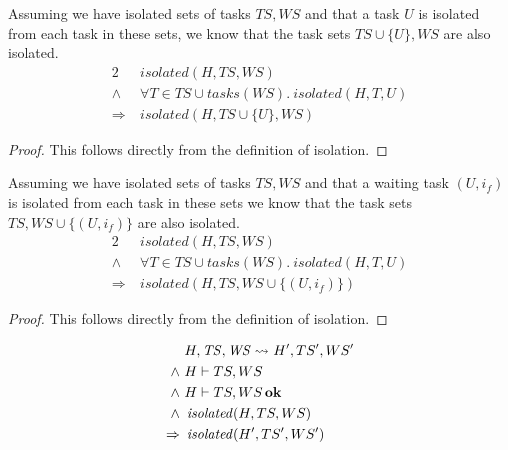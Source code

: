 \begin{lemma}\label{iso-step-ts}
Assuming we have isolated sets of tasks $TS, WS$ and that a task $U$ is isolated from each task in these sets, we know that the task sets $TS \cup \{U\}, WS$ are also isolated.
\begin{alignat*}{2}
    &isolated(H, TS, WS)\\
    \wedge\ &\forall T \in TS \cup tasks(WS).\ isolated(H, T, U)\\
    \Rightarrow\ &isolated(H, TS \cup \{U\}, WS)
\end{alignat*}
\end{lemma}
\begin{proof}
This follows directly from the definition of isolation.
\end{proof}

\begin{lemma}\label{iso-step-ws}
Assuming we have isolated sets of tasks $TS, WS$ and that a waiting task $(U,i_f)$ is isolated from each task in these sets we know that the task sets $TS, WS \cup \{(U,i_f)\}$ are also isolated.
\begin{alignat*}{2}
    &isolated(H, TS, WS)\\
    \wedge\ &\forall T \in TS \cup tasks(WS).\ isolated(H, T, U)\\
    \Rightarrow\ &isolated(H, TS,WS \cup \{(U, i_f)\})
\end{alignat*}
\end{lemma}
\begin{proof}
This follows directly from the definition of isolation.
\end{proof}

\begin{theorem}[Isolation]
\begin{alignat}{3}
    &\reductasks{}*[H']{}[TS',WS']* \label{iso-prem-reduc}\\
    \wedge\ & H \vdash TS, WS\\
    \wedge\ & H \vdash TS, WS \bn{ok} \label{iso-prem-ok}\\
    \wedge\ & \vn{isolated}(H, TS, WS) \label{iso-prem-iso}\\
    \Rightarrow\ & \vn{isolated}(H', TS', WS') \label{iso-concl}
\end{alignat}
\end{theorem}

